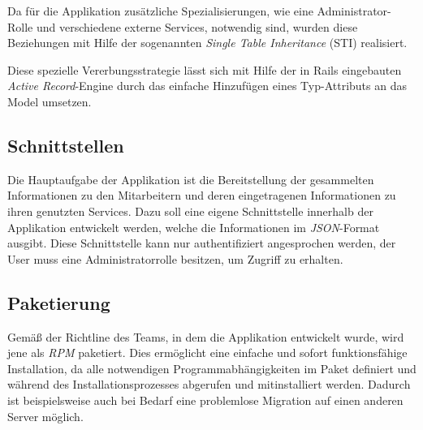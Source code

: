 Da für die Applikation zusätzliche Spezialisierungen, wie eine Administrator-Rolle und verschiedene
externe Services, notwendig sind, wurden diese Beziehungen mit Hilfe der sogenannten
\textit{Single Table Inheritance} (\acs{STI}) realisiert.


Diese spezielle Vererbungsstrategie lässt sich mit Hilfe der in Rails eingebauten
\textit{Active Record}-Engine durch das einfache Hinzufügen eines Typ-Attributs an das Model
umsetzen.

\subsection{Schnittstellen}
\label{sec:Schnittstellen}
Die Hauptaufgabe der Applikation ist die Bereitstellung der gesammelten Informationen zu den
Mitarbeitern und deren eingetragenen Informationen zu ihren genutzten Services. Dazu soll eine
eigene Schnittstelle innerhalb der Applikation entwickelt werden, welche die Informationen im
\textit{JSON}-Format ausgibt. Diese Schnittstelle kann nur authentifiziert angesprochen werden,
\dahe der User muss eine Administratorrolle besitzen, um Zugriff zu erhalten.

\subsection{Paketierung}
\label{sec:Paketierung}
Gemäß der Richtline des Teams, in dem die Applikation entwickelt wurde, wird jene als \textit{\acs{RPM}}
paketiert. Dies ermöglicht eine einfache und sofort funktionsfähige Installation, da alle
notwendigen Programmabhängigkeiten im Paket definiert und während des Installationsprozesses
abgerufen und mitinstalliert werden. Dadurch ist beispielsweise auch bei Bedarf eine problemlose
Migration auf einen anderen Server möglich.
